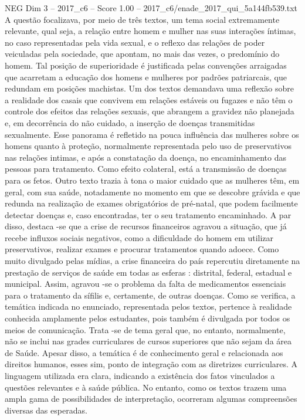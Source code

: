 \begin{textsample}{NEG Dim 3 – 2017\_c6 – Score 1.00 – 2017\_c6/enade\_2017\_qui\_5a144fb539.txt}
A questão focalizava, por meio de três textos, um tema social extremamente relevante, qual seja, a relação entre homem e mulher nas suas interações íntimas, no caso representadas pela vida sexual, e o reflexo das relações de poder veiculadas pela sociedade, que apontam, no mais das vezes, o predomínio do homem.
Tal posição de superioridade é justificada pelas convenções arraigadas que acarretam a educação dos homens e mulheres por padrões patriarcais, que redundam em posições machistas.
Um dos textos demandava uma reflexão sobre a realidade dos casais que convivem em relações estáveis ou fugazes e não têm o controle dos efeitos das relações sexuais, que abrangem a gravidez não planejada e, em decorrência do não cuidado, a inserção de doenças transmitidas sexualmente.
Esse panorama é refletido na pouca influência das mulheres sobre os homens quanto à proteção, normalmente representada pelo uso de preservativos nas relações intimas, e após a constatação da doença, no encaminhamento das pessoas para tratamento.
Como efeito colateral, está a transmissão de doenças para os fetos.
Outro texto trazia à tona o maior cuidado que as mulheres têm, em geral, com sua saúde, notadamente no momento em que se descobre grávida e que redunda na realização de exames obrigatórios de pré-natal, que podem facilmente detectar doenças e, caso encontradas, ter o seu tratamento encaminhado.
A par disso, destaca -se que a crise de recursos financeiros agravou a situação, que já recebe influxos sociais negativos, como a dificuldade do homem em utilizar preservativos, realizar exames e procurar tratamentos quando adoece.
Como muito divulgado pelas mídias, a crise financeira do país repercutiu diretamente na prestação de serviços de saúde em todas as esferas : distrital, federal, estadual e municipal.
Assim, agravou -se o problema da falta de medicamentos essenciais para o tratamento da sífilis e, certamente, de outras doenças.
Como se verifica, a temática indicada no enunciado, representada pelos textos, pertence à realidade conhecida amplamente pelos estudantes, pois também é divulgada por todos os meios de comunicação.
Trata -se de tema geral que, no entanto, normalmente, não se inclui nas grades curriculares de cursos superiores que não sejam da área de Saúde.
Apesar disso, a temática é de conhecimento geral e relacionada aos direitos humanos, esses sim, ponto de integração com as diretrizes curriculares.
A linguagem utilizada era clara, indicando a existência dos fatos vinculados a questões relevantes e à saúde pública.
No entanto, como os textos trazem uma ampla gama de possibilidades de interpretação, ocorreram algumas compreensões diversas das esperadas.

\end{textsample}

